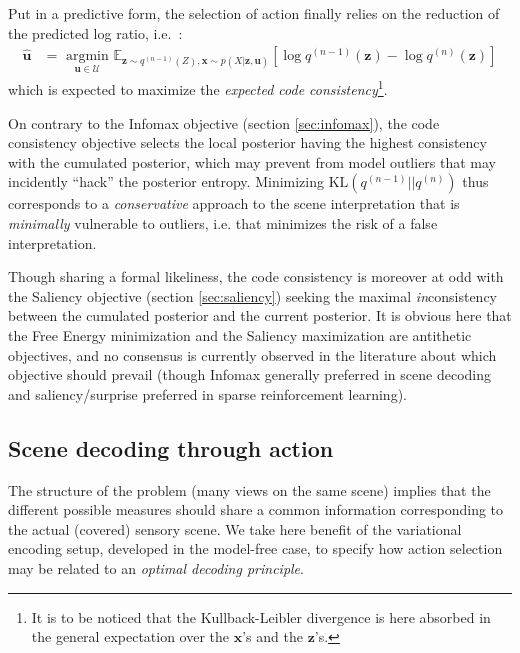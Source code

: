 \documentclass[12pt,twoside,openright]{article}
\begin{document}
Put in a predictive form, the selection of action finally relies on the reduction of the predicted log ratio, i.e.~:
\begin{align}
\hat{\boldsymbol{u}} &= \underset{\boldsymbol{u} \in \mathcal{U}}{\text{ argmin }} \mathbb{E}_{\boldsymbol{z} \sim q^{(n-1)}(Z), \boldsymbol{x} \sim p(X|\boldsymbol{z}, \boldsymbol{u})}\left[\log q^{(n-1)}(\boldsymbol{z}) - \log q^{(n)}(\boldsymbol{z})\right]
\end{align}
which is expected to maximize the \emph{expected code consistency}\footnote{It is to be noticed  that the  Kullback-Leibler divergence is here absorbed in the general expectation over the $\boldsymbol{x}$'s and the $\boldsymbol{z}$'s.}.

On contrary to the Infomax objective (section \ref{sec:infomax}), the code consistency objective selects the local posterior having the highest consistency with the cumulated posterior, which may prevent from model outliers that may incidently ``hack'' the posterior entropy.
Minimizing $\text{KL}(q^{(n-1)}||q^{(n)})$ thus corresponds to a \emph{conservative} approach to the scene interpretation
that is \emph{minimally} vulnerable to outliers, i.e. that minimizes the risk of a false interpretation. 

Though sharing a formal likeliness, the code consistency is moreover at odd with the Saliency objective (section \ref{sec:saliency}) seeking the maximal \emph{in}consistency between the cumulated posterior and the current posterior.
It is obvious here that the Free Energy minimization and the Saliency maximization are antithetic objectives, and no consensus is currently observed in the literature about which objective should prevail (though Infomax generally preferred in scene decoding and saliency/surprise preferred in sparse reinforcement learning).





\subsection{Scene decoding through action}
The structure of the problem (many views on the same scene) implies that the different possible measures should share a common information corresponding to the actual (covered) sensory scene.
We take here benefit of the variational encoding setup, developed in the model-free case, to specify how action selection may be related to an \emph{optimal decoding principle}.
\end{document}
